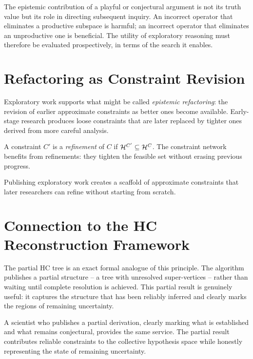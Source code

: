 \begin{remark}
The epistemic contribution of a playful or conjectural argument is not its truth value but its role in directing subsequent inquiry. An incorrect operator that eliminates a productive subspace is harmful; an incorrect operator that eliminates an unproductive one is beneficial. The utility of exploratory reasoning must therefore be evaluated prospectively, in terms of the search it enables.
\end{remark}

\section{Refactoring as Constraint Revision}

Exploratory work supports what might be called \emph{epistemic refactoring}: the revision of earlier approximate constraints as better ones become available. Early-stage research produces loose constraints that are later replaced by tighter ones derived from more careful analysis.

\begin{definition}
A constraint $C'$ is a \emph{refinement} of $C$ if $\mathcal{H}^{C'} \subseteq \mathcal{H}^C$. The constraint network benefits from refinements: they tighten the feasible set without erasing previous progress.
\end{definition}

Publishing exploratory work creates a scaffold of approximate constraints that later researchers can refine without starting from scratch.

\section{Connection to the HC Reconstruction Framework}

The partial HC tree is an exact formal analogue of this principle. The algorithm publishes a partial structure -- a tree with unresolved super-vertices -- rather than waiting until complete resolution is achieved. This partial result is genuinely useful: it captures the structure that has been reliably inferred and clearly marks the regions of remaining uncertainty.

A scientist who publishes a partial derivation, clearly marking what is established and what remains conjectural, provides the same service. The partial result contributes reliable constraints to the collective hypothesis space while honestly representing the state of remaining uncertainty.

